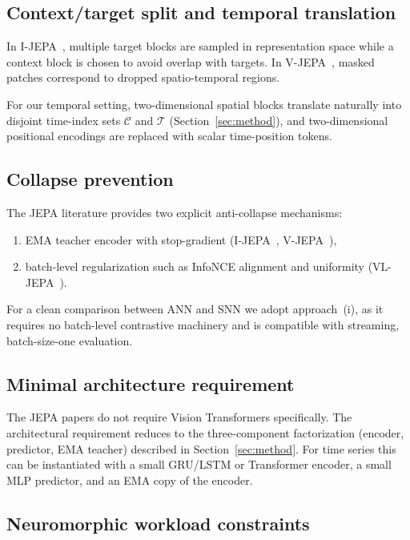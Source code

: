 \documentclass[11pt,a4paper]{article}
\begin{document}
\subsection{Context/target split and temporal translation}

In I-JEPA~\cite{assran2023ijepa}, multiple target blocks are sampled in representation space while
a context block is chosen to avoid overlap with targets.  In
V-JEPA~\cite{bardes2024vjepa},
masked patches correspond to dropped spatio-temporal regions.

For our temporal setting, two-dimensional spatial blocks translate
naturally into disjoint time-index sets $\mathcal{C}$ and $\mathcal{T}$
(Section~\ref{sec:method}), and two-dimensional positional encodings are
replaced with scalar time-position tokens.

\subsection{Collapse prevention}

The JEPA literature provides two explicit anti-collapse mechanisms:

\begin{enumerate}[nosep,label=(\roman*)]
\item EMA teacher encoder with stop-gradient
  (I-JEPA~\cite{assran2023ijepa}, V-JEPA~\cite{bardes2024vjepa}),
\item batch-level regularization such as InfoNCE alignment and uniformity
  (VL-JEPA~\cite{zhai2025vljepa}).
\end{enumerate}

For a clean comparison between ANN and SNN we adopt approach~(i), as it
requires no batch-level contrastive machinery and is compatible with
streaming, batch-size-one evaluation.

\subsection{Minimal architecture requirement}

The JEPA papers do not require Vision Transformers specifically.  The
architectural requirement reduces to the three-component factorization
(encoder, predictor, EMA teacher) described in
Section~\ref{sec:method}.  For time series this can be instantiated with
a small GRU/LSTM or Transformer encoder, a small MLP predictor, and an
EMA copy of the encoder.

\subsection{Neuromorphic workload constraints}
\end{document}
